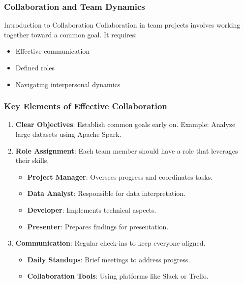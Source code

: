\documentclass[aspectratio=169]{beamer}
\begin{document}
\begin{frame}[fragile]
    \frametitle{Collaboration and Team Dynamics}
    \begin{block}{Introduction to Collaboration}
        Collaboration in team projects involves working together toward a common goal. It requires:
        \begin{itemize}
            \item Effective communication
            \item Defined roles
            \item Navigating interpersonal dynamics
        \end{itemize}
    \end{block}
\end{frame}

\begin{frame}[fragile]
    \frametitle{Key Elements of Effective Collaboration}
    \begin{enumerate}
        \item \textbf{Clear Objectives}: Establish common goals early on. Example: Analyze large datasets using Apache Spark.
        \item \textbf{Role Assignment}: Each team member should have a role that leverages their skills.
        \begin{itemize}
            \item \textbf{Project Manager}: Oversees progress and coordinates tasks.
            \item \textbf{Data Analyst}: Responsible for data interpretation.
            \item \textbf{Developer}: Implements technical aspects.
            \item \textbf{Presenter}: Prepares findings for presentation.
        \end{itemize}
        \item \textbf{Communication}: Regular check-ins to keep everyone aligned.
        \begin{itemize}
            \item \textbf{Daily Standups}: Brief meetings to address progress.
            \item \textbf{Collaboration Tools}: Using platforms like Slack or Trello.
        \end{itemize}
    \end{enumerate}
\end{frame}
\end{document}
